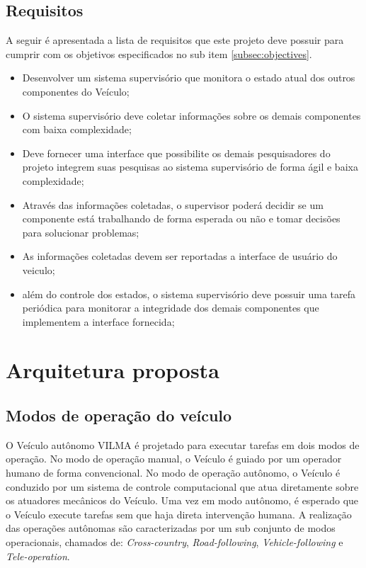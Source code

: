 \documentclass[conference]{IEEEtran}
\begin{document}
\subsection{Requisitos}\label{subsec:requirements}

A seguir é apresentada a lista de requisitos que este projeto deve possuir para cumprir com os objetivos especificados no sub item \ref{subsec:objectives}.

\begin{itemize}
	\item Desenvolver um sistema supervisório que monitora o estado atual dos outros componentes do Veículo;
	\item O sistema supervisório deve coletar informações sobre os demais componentes com baixa complexidade;
	\item Deve fornecer uma interface que possibilite os demais pesquisadores do projeto integrem suas pesquisas ao sistema supervisório de forma ágil e baixa complexidade;
	\item Através das informações coletadas, o supervisor poderá decidir se um componente está trabalhando de forma esperada ou não e tomar decisões para solucionar problemas;
	\item As informações coletadas devem ser reportadas a interface de usuário do veiculo;
	\item além do controle dos estados, o sistema supervisório deve possuir uma tarefa periódica para monitorar a integridade dos demais componentes que implementem a interface fornecida;
\end{itemize}


\section{Arquitetura proposta}\label{sec:proposal_architecture}



\subsection{Modos de operação do veículo}\label{subsec:operation_modes}

O Veículo autônomo VILMA é projetado para executar tarefas em dois modos de operação. No modo de operação manual, o Veículo é guiado por um operador humano de forma convencional. No modo de operação autônomo, o Veículo é conduzido por um sistema de controle computacional que atua diretamente sobre os atuadores mecânicos do Veículo. Uma vez em modo autônomo, é esperado que o Veículo execute tarefas sem que haja direta intervenção humana. A realização das operações autônomas são caracterizadas por um sub conjunto de modos operacionais, chamados de: \textit{Cross-country}, \textit{Road-following}, \textit{Vehicle-following} e \textit{Tele-operation}.
\end{document}
